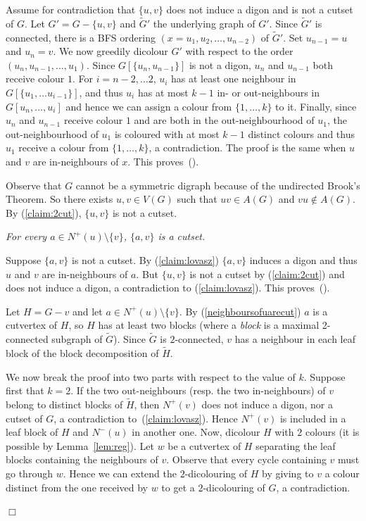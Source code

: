 \documentclass[11pt]{article}
\newcounter{claim}
\newenvironment{proof}[1][]%
 {\noindent {\setcounter{claim}{0}\sc proof ---
   }{#1}{}}{\hfill$\Box$\vspace{2ex}}
\newenvironment{claim}[1][]%
{\refstepcounter{claim}\vspace{1ex}\noindent{(\it\arabic{claim}){#1}{}}\it}{\vspace{1ex}}
\newenvironment{proofclaim}[1][]%
	{\noindent {}{#1}{}}{ This proves~(\arabic{claim}).\vspace{2ex}}
\begin{document}
\begin{proof}
\begin{proofclaim}
Assume for contradiction that $\{u, v\}$ does not induce a digon and is not a cutset of $G$. 
Let $G' = G - \{u, v\}$ and $\tilde{G}'$  the underlying graph of $G'$. Since $\tilde{G}'$ is connected, there is a BFS ordering $(x = u_{1}, u_{2}, \dots, u_{n-2})$ of $\tilde{G}'$. Set $u_{n-1} = u$ and $u_{n} = v$. 
We now greedily dicolour $G'$ with respect to the order $(u_n, u_{n-1}, \dots, u_1)$.  Since $G[\{u_{n}, u_{n-1}\}]$ is not a digon, $u_{n}$ and  $u_{n-1}$ both receive colour $1$. For $i=n-2, \dots 2$, $u_i$ has at least one neighbour in $G[\{u_1, \dots u_{i-1}\}]$, and thus $u_i$ has at most $k-1$ in- or out-neighbours in $G[u_n, \dots, u_i]$ and hence we can assign a colour from $\{1, \dots, k\}$ to it.  
Finally, since $u_n$ and $u_{n-1}$ receive colour $1$ and are both in the out-neighbourhood of $u_1$, the out-neighbourhood of $u_1$ is coloured with at most $k-1$ distinct colours and thus $u_1$ receive a colour from $\{1, \dots, k\}$, a contradiction. 
The proof is the same when $u$ and $v$ are in-neighbours of $x$.
\end{proofclaim}
\medskip

Observe that $G$ cannot be a symmetric digraph because of the undirected Brook's Theorem. So there exists $u, v \in V(G)$ such that $uv \in A(G)$ and $vu \notin A(G)$. 
By (\ref{claim:2cut}), $\{u, v\}$ is not a cutset.

\begin{claim}\label{neighboursofuarecut}
For every $a \in N^+(u) \setminus \{v\}$, $\{a, v\}$ is a cutset. 
\end{claim}

\begin{proofclaim}
Suppose $\{a, v\}$ is not a cutset. By (\ref{claim:lovasz}) $\{a,v\}$ induces a digon and thus $u$ and $v$ are in-neighbours of $a$. But $\{u,v\}$ is not a cutset by (\ref{claim:2cut}) and does not induce a digon, a contradiction to (\ref{claim:lovasz}).
\end{proofclaim}
\medskip

Let $H = G - v$ and let $a \in N^+(u) \setminus \{v\}$. 
By (\ref{neighboursofuarecut}) $a$ is a cutvertex of $H$, so $H$ has at least two blocks (where a \textit{block} is a maximal 2-connected subgraph of $\tilde G$).
Since $\tilde G$ is $2$-connected, $v$ has a neighbour in each leaf block of the block decomposition of $\tilde H$. 

We now break the proof into two parts with respect to the value of $k$. 
Suppose first that $k = 2$. 
If the two out-neighbours (resp. the two in-neighbours) of $v$ belong to distinct blocks of $\tilde H$, then $N^+(v)$ does not induce a digon, nor a cutset of $G$, a contradiction to~(\ref{claim:lovasz}). 
Hence $N^+(v)$ is included in a leaf block of $H$ and  $N^-(u)$ in another one.
Now, dicolour $H$ with $2$ colours (it is possible by Lemma~\ref{lem:reg}). 
Let $w$ be a cutvertex of $H$ separating the leaf blocks containing the neighbours of $v$. Observe that every cycle containing $v$ must go through $w$. Hence we can extend the $2$-dicolouring of $H$ by giving to $v$ a colour distinct from the one received by $w$  to get a $2$-dicolouring of $G$, a contradiction.


\end{proof}
\end{document}
